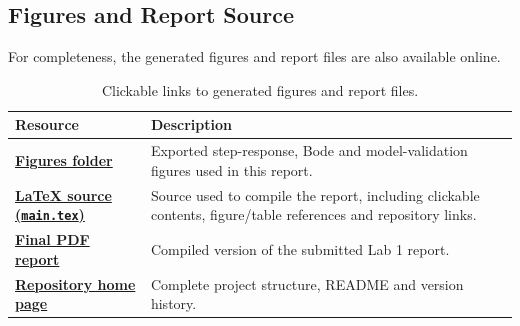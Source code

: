 \documentclass[12pt,a4paper]{article}
\newcommand{\repourl}{
https://github.com/NateDogg247/EEE3094S---Lab1-System-Identification
}
\newcommand{\figuresurl}{
https://github.com/NateDogg247/EEE3094S---Lab1-System-Identification/tree/main/Figures
}
\newcommand{\latexurl}{
https://github.com/NateDogg247/EEE3094S---Lab1-System-Identification/blob/main/Report/main.tex
}
\newcommand{\reportpdfurl}{
https://github.com/NateDogg247/EEE3094S---Lab1-System-Identification/blob/main/Report/PTRJUN003_EEE3094S_Lab1_Report.pdf
}
\begin{document}
\subsection{Figures and Report Source}

For completeness, the generated figures and report files are also
available online.

\begin{table}[H]
    \centering
    \caption{Clickable links to generated figures and report files.}
    \label{tab:reprolinks}

    \renewcommand{\arraystretch}{1.35}

    \begin{tabular}{
        |>{\raggedright\arraybackslash}p{}
        |>{\raggedright\arraybackslash}p{}|
    }
        \hline

        \rowcolor{gray!15}
        \textbf{Resource} &
        \textbf{Description} \\

        \hline

        \href{\figuresurl}{
            \textbf{Figures folder}
        }
        &
        Exported step-response, Bode and model-validation figures
        used in this report. \\

        \hline

        \href{\latexurl}{
            \textbf{LaTeX source (\texttt{main.tex})}
        }
        &
        Source used to compile the report, including clickable
        contents, figure/table references and repository links. \\

        \hline

        \href{\reportpdfurl}{
            \textbf{Final PDF report}
        }
        &
        Compiled version of the submitted Lab 1 report. \\

        \hline

        \href{\repourl}{
            \textbf{Repository home page}
        }
        &
        Complete project structure, README and version history. \\

        \hline
    \end{tabular}
\end{table}
\end{document}
